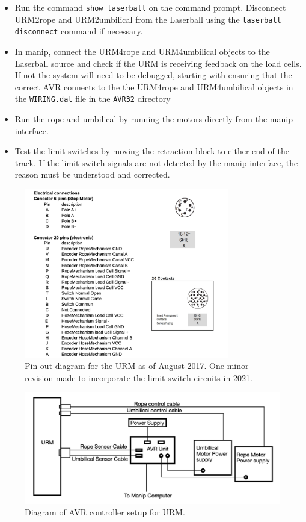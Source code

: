 \documentclass[11pt]{article}
\begin{document}
\begin{enumerate}[label={$\square$}]
\begin{itemize}[label=$\square$]
  \item Run the command \verb+show laserball+ on the command prompt. Disconnect URM2rope and URM2umbilical from the Laserball using the \verb+laserball disconnect+ command if necessary.
  \item In manip, connect the URM4rope and URM4umbilical objects to
    the Laserball source and check if the URM is receiving feedback on
    the load cells. If not the system will need to be debugged,
    starting with ensuring that the correct AVR connects to the the
    URM4rope and URM4umbilical objects in the \verb+WIRING.dat+ file
    in the \verb+AVR32+ directory
  \item Run the rope and umbilical by running the motors directly from
    the manip interface.
  \item Test the limit switches by moving the retraction block to either
    end of the track. If the limit switch signals are not detected by
    the manip interface, the reason must be understood and corrected.
  \end{itemize}
\end{enumerate}

\begin{figure}
  \includegraphics[width=0.8\textwidth]{20ConnectorPinOut}
  \caption{Pin out diagram for the URM as of August 2017. One minor revision made to incorporate the limit switch circuits in 2021.}
  \label{fig:pinout}
\end{figure}

\begin{figure}
  \includegraphics[width=\textwidth]{URMAVR_Setup}
  \caption{Diagram of AVR controller setup for URM.}
  \label{fig:controller}
\end{figure}
\end{document}
